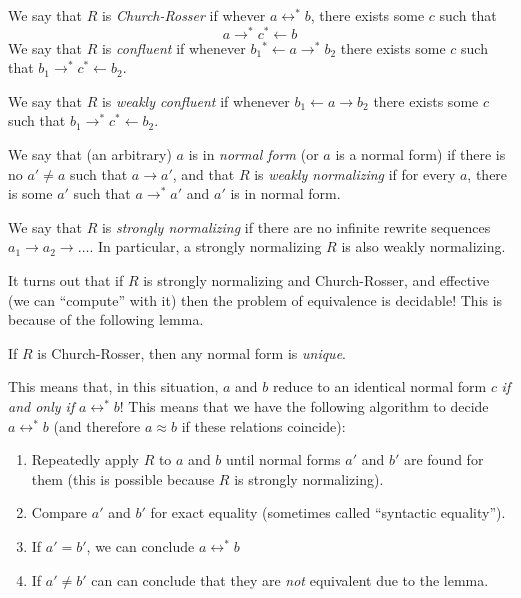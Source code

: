 \begin{definition}
  We say that $R$ is \emph{Church-Rosser} if whever $a\leftrightarrow^* b$, there exists some $c$ such that
  \[a\rightarrow^* c{}^*\leftarrow b\]
  We say that $R$ is \emph{confluent} if whenever $b_1{}^*\leftarrow a\rightarrow^* b_2$ there exists some $c$ such that $b_1\rightarrow^* c{}^*\leftarrow b_2$.
  
  We say that $R$ is \emph{weakly confluent} if whenever $b_1\leftarrow a\rightarrow b_2$ there exists some $c$ such that $b_1\rightarrow^* c{}^*\leftarrow b_2$.
  
  We say that (an arbitrary) $a$ is in \emph{normal form} (or $a$ is a normal form) if there is no $a' \neq a$ such that $a \rightarrow a'$, and that $R$ is \emph{weakly normalizing} if for every $a$, there is some $a'$ such that $a\rightarrow^*a'$ and $a'$ is in normal form.

  We say that $R$ is \emph{strongly normalizing} if there are no infinite rewrite sequences $a_1\rightarrow a_2\rightarrow \ldots$. In particular, a strongly normalizing $R$ is also weakly normalizing.
\end{definition}

It turns out that if $R$ is strongly normalizing and Church-Rosser, and effective (we can ``compute'' with it) then the problem of equivalence is decidable! This is because of the following lemma.

\begin{lemma}
  If $R$ is Church-Rosser, then any normal form is \emph{unique}.
\end{lemma}

This means that, in this situation, $a$ and $b$ reduce to an identical normal form $c$ \emph{if and only if} $a\leftrightarrow^* b$! This means that we have the following algorithm to decide $a\leftrightarrow^* b$ (and therefore $a\approx b$ if these relations coincide):
\begin{enumerate}
\item Repeatedly apply $R$ to $a$ and $b$ until normal forms $a'$ and $b'$ are found for them (this is possible because $R$ is strongly normalizing).
\item Compare $a'$ and $b'$ for exact equality (sometimes called ``syntactic equality'').
\item If $a' = b'$, we can conclude $a\leftrightarrow^* b$
\item If $a' \neq b'$ can can conclude that they are \emph{not} equivalent due to the lemma.
\end{enumerate}


